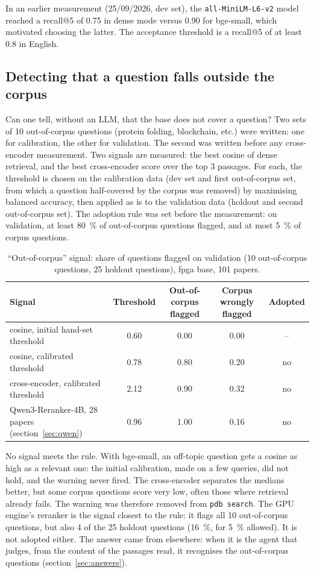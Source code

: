 \documentclass[11pt,a4paper]{article}
\newcommand{\cmd}[1]{\texttt{#1}}
\begin{document}
In an earlier measurement (25/09/2026, dev set), the \cmd{all-MiniLM-L6-v2} model reached a
recall@5 of 0.75 in dense mode versus 0.90 for bge-small, which motivated choosing the
latter. The acceptance threshold is a recall@5 of at least 0.8 in English.

\subsection{Detecting that a question falls outside the corpus}
\label{sec:horscorpus}

Can one tell, without an LLM, that the base does not cover a question? Two sets of 10
out-of-corpus questions (protein folding, blockchain, etc.) were written: one for
calibration, the other for validation. The second was written before any cross-encoder
measurement. Two signals are measured: the best cosine of dense retrieval, and the best
cross-encoder score over the top 3 passages. For each, the threshold is chosen on the
calibration data (dev set and first out-of-corpus set, from which a question half-covered by
the corpus was removed) by maximising balanced accuracy, then applied as is to the
validation data (holdout and second out-of-corpus set). The adoption rule was set before the
measurement: on validation, at least 80~\% of out-of-corpus questions flagged, and at most
5~\% of corpus questions.

\begin{table}[ht]
\centering
\caption{``Out-of-corpus'' signal: share of questions flagged on validation (10
out-of-corpus questions, 25 holdout questions), fpga base, 101 papers.}
\label{tab:horscorpus}
\small\setlength{\tabcolsep}{4pt}
\begin{tabular}{@{}p{5.6cm}cccc@{}}
\toprule
Signal & Threshold & Out-of-corpus flagged & Corpus wrongly flagged & Adopted \\
\midrule
cosine, initial hand-set threshold & 0.60 & 0.00 & 0.00 & -- \\
cosine, calibrated threshold & 0.78 & 0.80 & 0.20 & no \\
cross-encoder, calibrated threshold & 2.12 & 0.90 & 0.32 & no \\
\midrule
Qwen3-Reranker-4B, 28 papers (section~\ref{sec:qwen}) & 0.96 & 1.00 & 0.16 & no \\
\bottomrule
\end{tabular}
\end{table}

No signal meets the rule. With bge-small, an off-topic question gets a cosine as high as a
relevant one: the initial calibration, made on a few queries, did not hold, and the warning
never fired. The cross-encoder separates the medians better, but some corpus questions score
very low, often those where retrieval already fails. The warning was therefore removed from
\cmd{pdb search}. The GPU engine's reranker is the signal closest to the
rule: it flags all 10 out-of-corpus questions, but also 4 of the 25 holdout questions
(16~\%, for 5~\% allowed). It is not adopted either. The answer came from elsewhere: when it
is the agent that judges, from the content of the passages read, it recognises the
out-of-corpus questions (section~\ref{sec:answers}).
\end{document}

